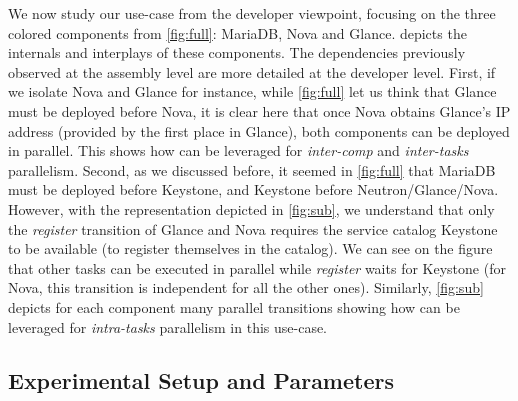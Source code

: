 We now study our use-case from the developer viewpoint, focusing on the three
colored components from \cref{fig:full}: MariaDB, Nova and Glance.
 depicts the internals and interplays of these components.
%
The dependencies previously observed at the assembly level are more
detailed at the developer level.
First, if we isolate Nova and Glance for instance, while \cref{fig:full} let us
think that Glance must be deployed before Nova, it is clear here that once Nova
obtains Glance's IP address (provided by the first place in Glance), both
components can be deployed in parallel. This shows how \mad can be leveraged for
\emph{inter-comp} and \emph{inter-tasks} parallelism.
Second, as we discussed before, it seemed in \cref{fig:full} that
MariaDB must be deployed before Keystone, and Keystone before
Neutron/Glance/Nova. However, with the \mad representation depicted in
\cref{fig:sub}, we understand that only the \emph{register} transition of Glance
and Nova requires the service catalog Keystone to be available (\ie to register
themselves in the catalog). We can see on the figure that other tasks can be
executed in parallel while \emph{register} waits for Keystone (\eg for Nova,
this transition is independent for all the other ones). Similarly,
\cref{fig:sub} depicts for each component many parallel transitions showing how
\mad can be leveraged for \emph{intra-tasks} parallelism in this use-case.

\subsection{Experimental Setup and Parameters}

